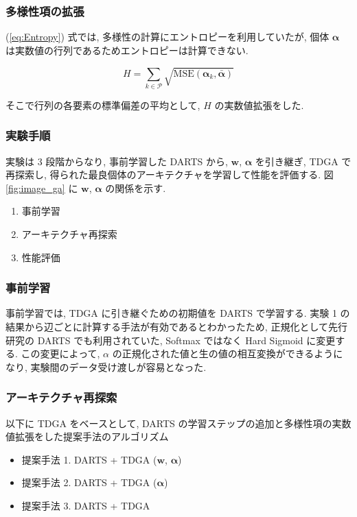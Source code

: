 \subsubsection{多様性項の拡張}
(\ref{eq:Entropy}) 式では, 多様性の計算にエントロピーを利用していたが,
個体 $\bm{\alpha}$ は実数値の行列であるためエントロピーは計算できない.

\begin{equation}
H = \sum_{k \in \mathcal{P}} \sqrt{\mathrm{MSE}(\bm{\alpha}_k, \bar{\bm{\alpha}})} \label{eq:Entropy-new}
\end{equation}

そこで行列の各要素の標準偏差の平均として, $H$ の実数値拡張をした.


\subsubsection{実験手順}
実験は 3 段階からなり, 事前学習した DARTS から, $\bm{w}$, $\bm{\alpha}$ を引き継ぎ,
TDGA で再探索し, 得られた最良個体のアーキテクチャを学習して性能を評価する.
図 \ref{fig:image_ga} に $\bm{w}$, $\bm{\alpha}$ の関係を示す.

\begin{enumerate}
  \item 事前学習
  \item アーキテクチャ再探索
  \item 性能評価
\end{enumerate}

\subsubsection{事前学習}

事前学習では, TDGA に引き継ぐための初期値を DARTS で学習する.
実験 1 の結果から辺ごとに計算する手法が有効であるとわかったため,
正規化として先行研究の DARTS でも利用されていた,
Softmax ではなく Hard Sigmoid に変更する.
この変更によって, $\alpha$ の正規化された値と生の値の相互変換ができるようになり,
実験間のデータ受け渡しが容易となった.


\subsubsection{アーキテクチャ再探索}

以下に TDGA をベースとして, DARTS の学習ステップの追加と多様性項の実数値拡張をした提案手法のアルゴリズム

\begin{itemize}
  \item 提案手法 1. DARTS + TDGA ($\bm{w}$, $\bm{\alpha}$)
  \item 提案手法 2. DARTS + TDGA ($\bm{\alpha}$)
  \item 提案手法 3. DARTS + TDGA
\end{itemize}

